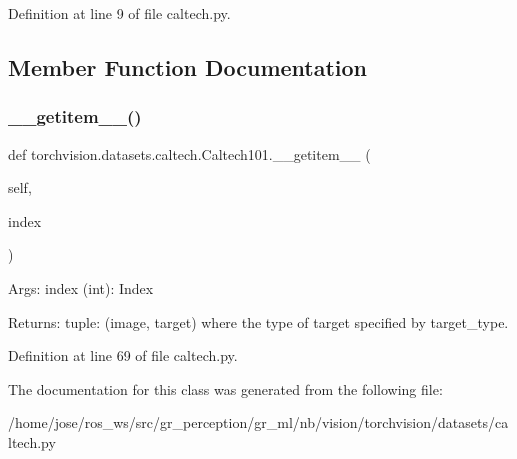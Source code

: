 Definition at line 9 of file caltech.\+py.



\subsection{Member Function Documentation}
\mbox{\label{classtorchvision_1_1datasets_1_1caltech_1_1Caltech101_aab20aea2638bfab3ce6b3af9fde34284}} 
\subsubsection{\texorpdfstring{\+\_\+\+\_\+getitem\+\_\+\+\_\+()}{\_\_getitem\_\_()}}
{\footnotesize\ttfamily def torchvision.\+datasets.\+caltech.\+Caltech101.\+\_\+\+\_\+getitem\+\_\+\+\_\+ (\begin{DoxyParamCaption}\item[{}]{self,  }\item[{}]{index }\end{DoxyParamCaption})}

\begin{DoxyVerb}Args:
    index (int): Index

Returns:
    tuple: (image, target) where the type of target specified by target_type.
\end{DoxyVerb}
 

Definition at line 69 of file caltech.\+py.



The documentation for this class was generated from the following file\+:\begin{DoxyCompactItemize}
\item 
/home/jose/ros\+\_\+ws/src/gr\+\_\+perception/gr\+\_\+ml/nb/vision/torchvision/datasets/caltech.\+py\end{DoxyCompactItemize}
